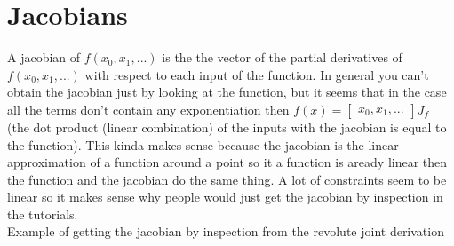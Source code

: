 \documentclass{article}
\begin{document}
\section*{Jacobians}
A jacobian of $f(x_0, x_1, ...)$ is the the vector of the partial derivatives of $f(x_0, x_1, ...)$ with respect to each input of the function. In general you can't obtain the jacobian just by looking at the function, but it seems that in the case all the terms don't contain any exponentiation then $f(x) = \begin{bmatrix}x_0, x_1, ...\end{bmatrix}J_f$ (the dot product (linear combination) of the inputs with the jacobian is equal to the function). This kinda makes sense because the jacobian is the linear approximation of a function around a point so it a function is aready linear then the function and the jacobian do the same thing. A lot of constraints seem to be linear so it makes sense why people would just get the jacobian by inspection in the tutorials. \\
Example of getting the jacobian by inspection from the revolute joint derivation
\end{document}

